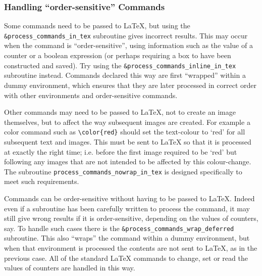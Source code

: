 \subsubsection{Handling ``order-sensitive'' Commands\label{sensit}}%
%
%
%
\begin{changebar}
Some commands need to be passed to \LaTeX, but using the 
\verb|&process_commands_in_tex| subroutine gives incorrect results. 
This may occur when the command is ``order-sensitive'',
using information such as the value of a counter or a boolean expression 
(or perhaps requiring a box to have been constructed and saved).
Try using the \verb|&process_commands_inline_in_tex| subroutine instead.
Commands declared this way are first ``wrapped'' within a dummy environment,
which ensures that they are later processed in correct order with other 
environments and order-sensitive commands.

\label{setparam}\html{\\}%

Other commands may need to be passed to \LaTeX, not to create an image
themselves, but to affect the way subsequent images are created.
For example a color command such as \verb|\color{red}| should set the
text-colour to `red' for all subsequent text and images. This must
be sent to \LaTeX{} so that it is processed at exactly the right time;
i.e. before the first image required to be `red' but following any
images that are not intended to be affected by this colour-change.\html{\\}
The subroutine \verb|process_commands_nowrap_in_tex| is designed
specifically to meet such requirements.

\label{wrapdef}\html{\\}%

Commands can be order-sensitive without having to be passed to \LaTeX.
Indeed even if a \Perl{} subroutine has been carefully written to process
the command, it may still give wrong results if it is order-sensitive,
depending on the values of counters, say.
To handle such cases there is the \verb|&process_commands_wrap_deferred|
subroutine. This also ``wraps'' the command within a dummy environment,
but when that environment is processed the contents are not sent to \LaTeX,
as in the previous case. All of the standard \LaTeX{} commands to change, 
set or read the values of counters are handled in this way.
\end{changebar}



